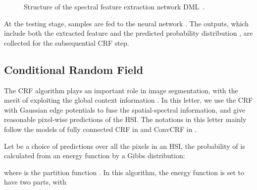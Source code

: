\documentclass[]{article}
\newcommand{\red}{\color{black}}
\newcommand{\magentaso}{\color{black}}
\begin{document}
\begin{figure}
{{
		}
		\caption{\label{mlp_struct} Structure of the spectral feature {\red extraction} network DML~\cite{guo2017spectral}.}
	}
\end{figure}

At the testing stage, samples  are fed to the neural network .
The outputs{, \magentaso which} include both the extracted
feature  and the predicted probability distribution , 
{\magentaso are} collected for the subsequential CRF step.

\subsection{Conditional Random Field}

The CRF algorithm plays an important role in image segmentation, with the merit of
exploiting the global context information
\cite{lafferty2001conditional, krahenbuhl2011efficient, teichmann2018convolutional}.
In this letter, we use the CRF with Gaussian edge potentials to fuse the spatial-spectral information, 
and give reasonable {\magentaso pixel-wise} predictions of the HSI.
The notations in this letter mainly follow the models of fully connected CRF in \cite{krahenbuhl2011efficient} and ConvCRF in \cite{teichmann2018convolutional}.


Let  be a choice of predictions over all the pixels in an HSI, the probability of  is calculated from
an energy function  by a Gibbs distribution:

where  is the partition function \cite{lafferty2001conditional}.
In this algorithm, the energy function  is set to have two parts, with
\end{document}
